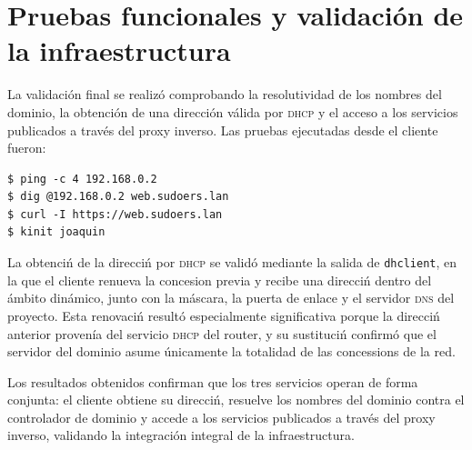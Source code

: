 \section{Pruebas funcionales y validaci\'on de la infraestructura}

La validaci\'on final se realiz\'o comprobando la resolutividad de los
nombres del dominio, la obtenci\'on de una direcci\'on v\'alida por
\textsc{dhcp} y el acceso a los servicios publicados a trav\'es del proxy
inverso. Las pruebas ejecutadas desde el cliente fueron:

\begin{lstlisting}[style=terminal]
$ ping -c 4 192.168.0.2
$ dig @192.168.0.2 web.sudoers.lan
$ curl -I https://web.sudoers.lan
$ kinit joaquin
\end{lstlisting}

La obtenci\'n de la direcci\'n por \textsc{dhcp} se valid\'o mediante la
salida de \texttt{dhclient}, en la que el cliente renueva la concesion
previa y recibe una direcci\'n dentro del \'ambito din\'amico, junto con la
m\'ascara, la puerta de enlace y el servidor \textsc{dns} del proyecto.
Esta renovaci\'n result\'o especialmente significativa porque la direcci\'n
anterior proven\'ia del servicio \textsc{dhcp} del router, y su
sustituci\'n confirm\'o que el servidor del dominio asume \'unicamente la
totalidad de las concessions de la red.

Los resultados obtenidos confirman que los tres servicios operan de forma
conjunta: el cliente obtiene su direcci\'n, resuelve los nombres del dominio
contra el controlador de dominio y accede a los servicios publicados a
trav\'es del proxy inverso, validando la integraci\'on integral de la
infraestructura.
